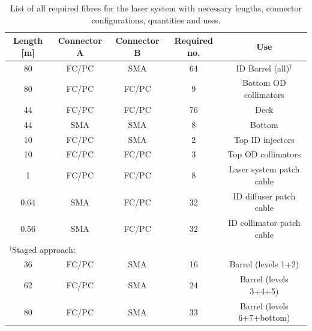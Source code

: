 \documentclass[a4paper,11pt]{article}
\begin{document}
\begin{table}[h]
\centering
\setlength{\tabcolsep}{4pt}
\begin{tabular}{ccccc}
\toprule
Length [m]	&	Connector A	&	Connector B	&	Required no.	&	Use		\\ \midrule
80			&	FC/PC		&	SMA			&	64				&	ID Barrel (all)$^\dagger$	\\
80			&	FC/PC		&	FC/PC		&	9				&	Bottom OD collimators \\
44			&	FC/PC		&	FC/PC		&	76				&	Deck	\\
44			&	SMA			&	SMA			&	8				&	Bottom	\\
10			&	FC/PC		&	SMA			&	2				&	Top ID injectors \\
10			&	FC/PC		&	FC/PC		&	3				&	Top OD collimators \\
1			&	FC/PC		&	FC/PC		&	8				&	Laser system patch cable \\
0.64		&	SMA			&	FC/PC		&	32				&	ID diffuser patch cable	\\
0.56		&	SMA			&	FC/PC		&	32				&	ID collimator patch cable	\\ \midrule
\multicolumn{3}{l}{$^\dagger$Staged approach:}			&					&			\\
36			&	FC/PC		&	SMA			&	16				&	Barrel (levels 1+2) \\
62			&	FC/PC		&	SMA			&	24				&	Barrel (levels 3+4+5)	\\
80			&	FC/PC		&	SMA			&	33				&	Barrel (levels 6+7+bottom)	\\
\bottomrule
\end{tabular}
\caption{List of all required fibres for the laser system with necessary lengths, connector configurations, quantities and uses.}\label{tab:fibreSummaryLaser}
\end{table}
\end{document}
